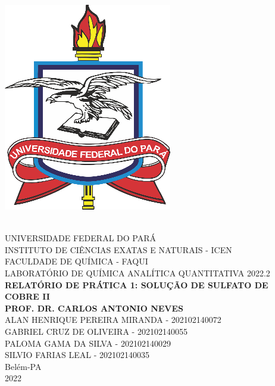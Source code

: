 \documentclass[a4paper, 11pt]{article}
\begin{document}
\thispagestyle{empty} %

\begin{center}
    \parbox{3cm}{\includegraphics[scale=1]{logo_ufpa}} \\
    {\vspace {1.0cm}}
    {\Large \uppercase {Universidade Federal do Pará}}\\
    {\Large \uppercase {Instituto de Ciências Exatas e Naturais - ICEN}}\\
    \vspace{3cm}
    {\Large \uppercase {Faculdade de Química - FAQUI}}\\
    {\Large \uppercase {Laboratório de Química Analítica Quantitativa 2022.2} }\\
    \vspace{3cm}
    {\Large \bf \uppercase {Relatório de Prática 1: Solução de Sulfato de Cobre II}}\\
    {\Large \bf \uppercase {Prof. Dr. Carlos Antonio Neves}}\\
    \vspace{3cm}
    {\Large \uppercase {Alan Henrique Pereira Miranda - 202102140072}}\\
    {\Large \uppercase {Gabriel Cruz de Oliveira - 202102140055}}\\
    {\Large \uppercase {Paloma Gama da Silva - 202102140029}}\\
    {\Large \uppercase {Silvio Farias Leal - 202102140035}}\\
    \vspace{0.5cm}
    {\Large  {Belém-PA \\ 2022}}
\end{center}
\end{document}
